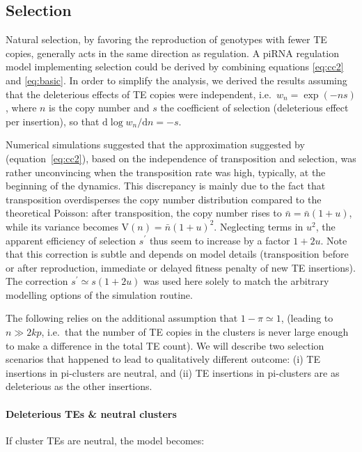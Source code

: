 \documentclass[10pt,a4paper]{article}
\begin{document}
\subsection{Selection}

Natural selection, by favoring the reproduction of genotypes with fewer TE copies, generally acts in the same direction as regulation. A piRNA regulation model implementing selection could be derived by combining equations \ref{eq:cc2} and \ref{eq:basic}. In order to simplify the analysis, we derived the results assuming that the deleterious effects of TE copies were independent, i.e.\ $w_n = \exp(- n s)$, where $n$ is the copy number and $s$ the coefficient of selection (deleterious effect per insertion), so that $\mathrm{d} \log w_n / \mathrm{d} n = -s$. 

Numerical simulations suggested that the approximation suggested by \citep{CC83} (equation~\ref{eq:cc2}), based on the independence of transposition and selection, was rather unconvincing when the transposition rate was high, typically, at the beginning of the dynamics. This discrepancy is mainly due to the fact that transposition overdisperses the copy number distribution compared to the theoretical Poisson: after transposition, the copy number rises to $\bar n = \bar n(1+u)$, while its variance becomes $\mathrm V(n) = \bar n (1+u)^2$. Neglecting terms in $u^2$, the apparent efficiency of selection $s^\prime$ thus seem to increase by a factor $1+2u$. Note that this correction is subtle and depends on model details (transposition before or after reproduction, immediate or delayed fitness penalty of new TE insertions). The correction $s^\prime \simeq s(1+2u)$ was used here solely to match the arbitrary modelling options of the simulation routine. 

The following relies on the additional assumption that $1-\pi \simeq 1$, (leading to $n \gg 2kp$, i.e.\ that the number of TE copies in the clusters is never large enough to make a difference in the total TE count). We will describe two selection scenarios that happened to lead to qualitatively different outcome: (i) TE insertions in pi-clusters are neutral, and (ii) TE insertions in pi-clusters are as deleterious as the other insertions. 

\paragraph{Deleterious TEs \& neutral clusters} If cluster TEs are neutral, the model becomes:
\end{document}
